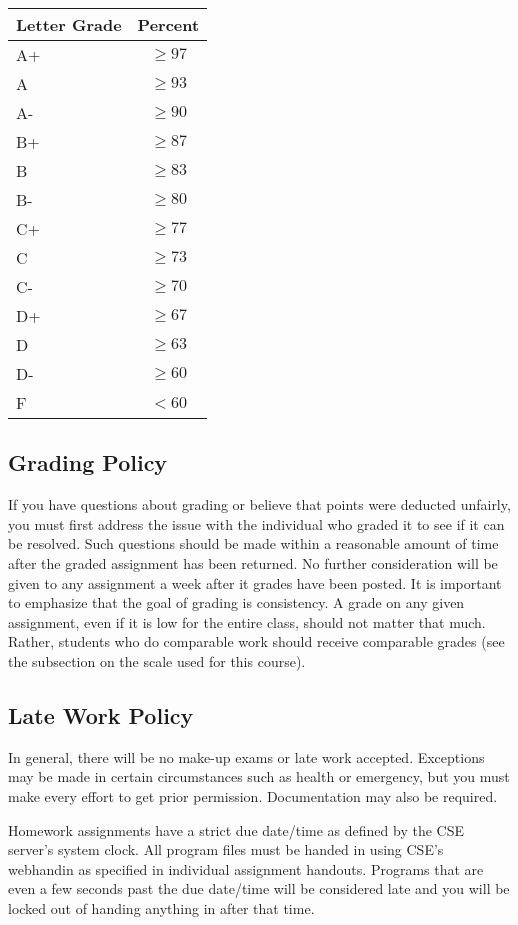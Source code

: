 \documentclass[12pt]{scrartcl}
\begin{document}
\begin{table}[h]
\centering
\begin{tabular}{p{1cm}c}
Letter Grade & Percent \\
\hline\hline
A+ & $\geq 97$ \\
A  & $\geq 93$ \\
A- & $\geq 90$ \\
B+ & $\geq 87$ \\
B  & $\geq 83$ \\
B- & $\geq 80$ \\
C+ & $\geq 77$ \\
C  & $\geq 73$ \\
C- & $\geq 70$ \\
D+ & $\geq 67$ \\
D  & $\geq 63$ \\
D- & $\geq 60$ \\
F  & $<60$ \\
\end{tabular}
\end{table}

\subsection{Grading Policy}

If you have questions about grading or believe that points were 
deducted unfairly, you must first address the issue with the 
individual who graded it to see if it can be resolved.  Such 
questions should be made within a reasonable amount of time 
after the graded assignment has been returned.  No further 
consideration will be given to any assignment a week after 
it grades have been posted.  It is important to emphasize that 
the goal of grading is consistency.  A grade on any given 
assignment, even if it is low for the entire class, should 
not matter that much.  Rather, students who do comparable 
work should receive comparable grades (see the subsection 
on the scale used for this course).

\subsection{Late Work Policy}

In general, there will be no make-up exams or late work
accepted.  Exceptions may be made in certain circumstances 
such as health or emergency, but you must make every effort 
to get prior permission.  Documentation may also be required.

Homework assignments have a strict due date/time as defined by
the CSE server's system clock.  All program files must be handed
in using CSE's webhandin as specified in individual assignment
handouts.  Programs that are even a few seconds past the due 
date/time will be considered late and you will be locked out
of handing anything in after that time.  
\end{document}
